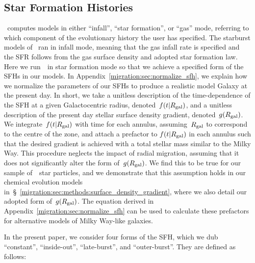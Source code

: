 \subsection{Star Formation Histories} 
\label{migration:sec:methods:sfhs} 
\vice~computes models in either ``infall'', ``star formation'', or ``gas'' 
mode, referring to which component of the evolutionary history the user has 
specified. 
The starburst models of~\citet{Johnson2020} ran in infall mode, 
meaning that the gas infall rate is specified and the SFR follows from the gas 
surface density and adopted star formation law. 
Here we run~\vice~in star formation mode so that we achieve a specified form of 
the SFHs in our models. 
In Appendix~\ref{migration:sec:normalize_sfh}, we explain how we normalize the parameters 
of our SFHs to produce a realistic model Galaxy at the present day. 
In short, we take a unitless description of the time-dependence of the SFH at a 
given Galactocentric radius, denoted~$f(t|R_\text{gal})$, and a unitless description 
of the present day stellar surface density gradient, denoted~$g(R_\text{gal})$. 
We integrate~$f(t|R_\text{gal})$ with time for each annulus, assuming~$R_\text{gal}$ to 
correspond to the centre of the zone, and attach a prefactor to 
$f(t|R_\text{gal})$ in each annulus such that the desired gradient is achieved 
with a total stellar mass similar to the Milky Way. 
This procedure neglects the impact of radial migration, assuming that it does 
not significantly alter the form of~$g(R_\text{gal})$. 
We find this to be true for our sample of~\hsim~star particles, and we 
demonstrate that this assumption holds in our chemical evolution models 
in~\S~\ref{migration:sec:methods:surface_density_gradient}, where we also detail our 
adopted form of~$g(R_\text{gal})$. 
The equation derived in Appendix~\ref{migration:sec:normalize_sfh} can be used to 
calculate these prefactors for alternative models of Milky Way-like galaxies. 
\par 
In the present paper, we consider four forms of the SFH, which we dub 
``constant'', ``inside-out'', ``late-burst'', and ``outer-burst''. 
They are defined as follows: 
